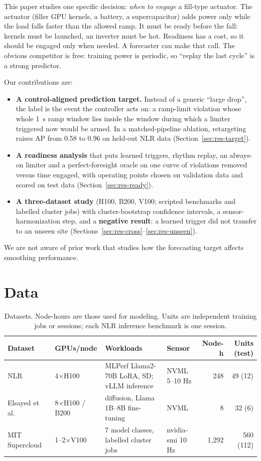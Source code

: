 \documentclass[11pt]{article}
\begin{document}
This paper studies one specific decision: \emph{when to engage} a fill-type actuator. The actuator (filler
GPU kernels, a battery, a supercapacitor) adds power only while the load falls faster than the allowed
ramp. It must be ready before the fall: kernels must be launched, an inverter must be hot. Readiness has a
cost, so it should be engaged only when needed. A forecaster can make that call. The obvious competitor is
free: training power is periodic, so ``replay the last cycle'' is a strong predictor.

Our contributions are:
\begin{itemize}
\item \textbf{A control-aligned prediction target.} Instead of a generic ``large drop'', the label is the
event the controller acts on: a ramp-limit violation whose whole 1~s ramp window lies inside the window
during which a limiter triggered now would be armed. In a matched-pipeline ablation, retargeting raises AP from 0.58 to 0.96 on held-out NLR
data (Section~\ref{sec:res-target}).
\item \textbf{A readiness analysis} that puts learned triggers, rhythm replay, an always-on limiter and a
perfect-foresight oracle on one curve of violations removed versus time engaged, with operating points
chosen on validation data and scored on test data (Section~\ref{sec:res-ready}).
\item \textbf{A three-dataset study} (H100, B200, V100; scripted benchmarks and labelled cluster jobs) with
cluster-bootstrap confidence intervals, a sensor-harmonization step, and a \textbf{negative result}: a
learned trigger did not transfer to an unseen site (Sections~\ref{sec:res-cross}--\ref{sec:res-unseen}).
\end{itemize}
We are not aware of prior work that studies how the forecasting target affects smoothing performance.

\section{Data}
\label{sec:data}

\begin{table}[t]
\centering
\caption{Datasets. Node-hours are those used for modeling. Units are independent training jobs or sessions; each NLR inference benchmark is one session.}
\label{tab:data}
\footnotesize
\begin{tabular}{@{}l l p{4.2cm} l r r@{}}
\toprule
Dataset & GPUs/node & Workloads & Sensor & Node-h & Units (test) \\
\midrule
NLR~\cite{nlr} & 4$\times$H100 & MLPerf Llama2-70B LoRA, SD; vLLM inference & NVML 5--10 Hz & 248 & 49 (12) \\
Elsayed et al.~\cite{elsayed} & 8$\times$H100 / B200 & diffusion, Llama 1B--8B fine-tuning & NVML & 8 & 32 (6) \\
MIT Supercloud~\cite{supercloud} & 1--2$\times$V100 & 7 model classes, labelled cluster jobs & nvidia-smi 10 Hz & 1,292 & 560 (112) \\
\bottomrule
\end{tabular}
\end{table}
\end{document}
